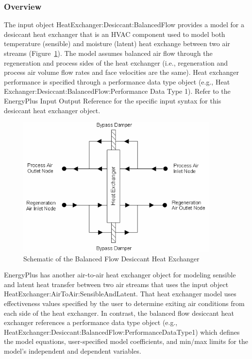 \subsubsection{Overview}\label{overview-2-006}

The input object HeatExchanger:Desiccant:BalancedFlow provides a model for a desiccant heat exchanger that is an HVAC component used to model both temperature (sensible) and moisture (latent) heat exchange between two air streams (Figure~\ref{fig:schematic-of-the-balanced-flow-desiccant-heat}). The model assumes balanced air flow through the regeneration and process sides of the heat exchanger (i.e., regeneration and process air volume flow rates and face velocities are the same). Heat exchanger performance is specified through a performance data type object (e.g., Heat Exchanger:Desiccant:BalancedFlow:Performance Data Type 1). Refer to the EnergyPlus Input Output Reference for the specific input syntax for this desiccant heat exchanger object.

\begin{figure}[hbtp] %
\centering
\includegraphics[width=0.9\textwidth, height=0.9\textheight, keepaspectratio=true]{media/image5554.png}
\caption{Schematic of the Balanced Flow Desiccant Heat Exchanger \protect \label{fig:schematic-of-the-balanced-flow-desiccant-heat}}
\end{figure}

EnergyPlus has another air-to-air heat exchanger object for modeling sensible and latent heat transfer between two air streams that uses the input object HeatExchanger:AirToAir:SensibleAndLatent. That heat exchanger model uses effectiveness values specified by the user to determine exiting air conditions from each side of the heat exchanger. In contrast, the balanced flow desiccant heat exchanger references a performance data type object (e.g., HeatExchanger:Desiccant:BalancedFlow:PerformanceDataType1) which defines the model equations, user-specified model coefficients, and min/max limits for the model's independent and dependent variables.

